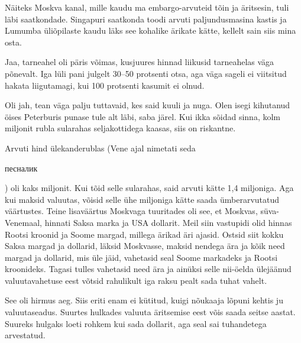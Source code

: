 
Näiteks Moskva kanal, mille kaudu ma embargo-arvuteid tõin ja 
äritsesin, tuli läbi saatkondade. Singapuri saatkonda toodi arvuti paljundusmasina 
kastis ja Lumumba üliõpilaste 
kaudu läks see kohalike ärikate kätte, kellelt sain siis mina osta. 


Jaa, tarneahel oli päris võimas, kusjuures hinnad liikusid tarneahelas väga 
põnevalt. Iga lüli pani julgelt 30--50 protsenti 
otsa, aga väga sageli ei viitsitud hakata liigutamagi, kui 100 protsenti 
kasumit ei olnud. 


Oli jah, tean väga palju tuttavaid, kes said kuuli ja nuga. Olen isegi 
kihutanud öises Peterburis punase tule alt läbi, saba järel. Kui 
ikka sõidad sinna, kolm miljonit rubla sularahas seljakottidega kaasas, siis 
on riskantne.

Arvuti hind ülekanderublas (Vene ajal nimetati seda \begin{russian}песналик\end{russian}) 
oli kaks miljonit. Kui tõid selle sularahas, said arvuti kätte 1,4 miljoniga. Aga kui maksid valuutas, 
võisid selle ühe miljoniga kätte saada ümberarvutatud väärtustes. Teine 
lisaväärtus Moskvaga tuuritades oli see, et Moskvas, 
süva-Venemaal, hinnati Saksa marka ja USA dollarit. Meil siin vastupidi 
olid hinnas Rootsi kroonid ja Soome margad, millega ärikad äri ajasid. Ostsid siit kokku Saksa margad ja dollarid, läksid 
Moskvasse, maksid nendega ära ja kõik need margad ja dollarid, mis üle 
jäid, vahetasid seal Soome markadeks ja Rootsi kroonideks. Tagasi tulles
vahetasid need ära ja ainüksi selle nii-öelda ülejäänud valuutavahetuse eest võtsid 
rahulikult iga raksu pealt sada tuhat vahelt. 

See oli hirmus aeg. Siis eriti enam ei kütitud, kuigi nõukaaja lõpuni kehtis 
ju valuutaseadus. Suurtes hulkades valuuta äritsemise eest võis saada 
seitse aastat. Suureks hulgaks loeti rohkem kui sada 
dollarit, aga seal sai tuhandetega arvestatud.

